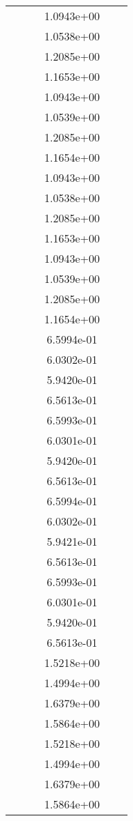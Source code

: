 \begin{xltabular}{\textwidth}{r|rS[table-format=1.3e+2]S[table-format=1.4e+2]S[table-format=1.4e+2]S[table-format=-1.5]}
&  &  & 1.0943e+00 & & \\
&  &  & 1.0538e+00 & & \\
&  &  & 1.2085e+00 & & \\
&  &  & 1.1653e+00 & & \\
&  &  & 1.0943e+00 & & \\
&  &  & 1.0539e+00 & & \\
&  &  & 1.2085e+00 & & \\
&  &  & 1.1654e+00 & & \\
&  &  & 1.0943e+00 & & \\
&  &  & 1.0538e+00 & & \\
&  &  & 1.2085e+00 & & \\
&  &  & 1.1653e+00 & & \\
&  &  & 1.0943e+00 & & \\
&  &  & 1.0539e+00 & & \\
&  &  & 1.2085e+00 & & \\
&  &  & 1.1654e+00 & & \\
&  &  & 6.5994e-01 & & \\
&  &  & 6.0302e-01 & & \\
&  &  & 5.9420e-01 & & \\
&  &  & 6.5613e-01 & & \\
&  &  & 6.5993e-01 & & \\
&  &  & 6.0301e-01 & & \\
&  &  & 5.9420e-01 & & \\
&  &  & 6.5613e-01 & & \\
&  &  & 6.5994e-01 & & \\
&  &  & 6.0302e-01 & & \\
&  &  & 5.9421e-01 & & \\
&  &  & 6.5613e-01 & & \\
&  &  & 6.5993e-01 & & \\
&  &  & 6.0301e-01 & & \\
&  &  & 5.9420e-01 & & \\
&  &  & 6.5613e-01 & & \\
&  &  & 1.5218e+00 & & \\
&  &  & 1.4994e+00 & & \\
&  &  & 1.6379e+00 & & \\
&  &  & 1.5864e+00 & & \\
&  &  & 1.5218e+00 & & \\
&  &  & 1.4994e+00 & & \\
&  &  & 1.6379e+00 & & \\
&  &  & 1.5864e+00 & & \\

\end{xltabular}
